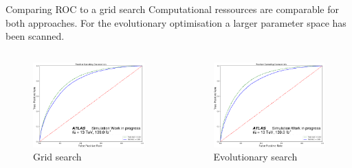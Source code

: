 \begin{frame}{Comparing ROC to a grid search}
    \centering Computational ressources are comparable for both approaches. For the evolutionary optimisation a larger parameter space has been scanned.
    \begin{columns}
        \begin{column}{0.5\textwidth}
            \begin{figure}
                \centering
                \includegraphics[width = \textwidth]{grid_ROC.png}
                \caption{Grid search}
            \end{figure}
        \end{column}
        \begin{column}{0.5\textwidth}
            \begin{figure}
                \centering
                \includegraphics[width = \textwidth]{evo_ROC.png}
                \caption{Evolutionary search}
            \end{figure}
        \end{column}
    \end{columns}
\end{frame}



